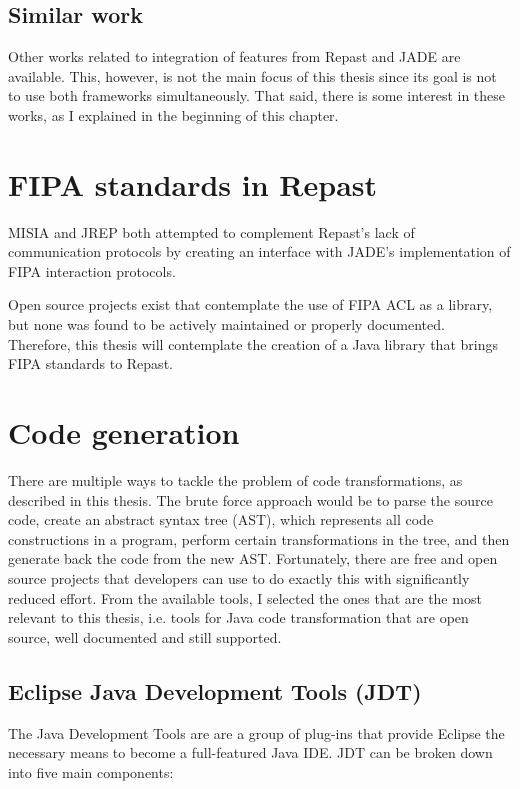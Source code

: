 \subsection{Similar work}
	Other works related to integration of features from Repast and JADE are available. This, however, is not the main focus of this thesis since its goal is not to use both frameworks simultaneously. That said, there is some interest in these works, as I explained in the beginning of this chapter. 


\section{FIPA standards in Repast}
	MISIA and JREP both attempted to complement Repast's lack of communication protocols by creating an interface with JADE's implementation of FIPA interaction protocols. 

	Open source projects exist that contemplate the use of FIPA ACL as a library, but none was found to be actively maintained or properly documented. Therefore, this thesis will contemplate the creation of a Java library that brings FIPA standards to Repast.


\section{Code generation}
	There are multiple ways to tackle the problem of code transformations, as described in this thesis. The brute force approach would be to parse the source code, create an abstract syntax tree (AST), which represents all code constructions in a program, perform certain transformations in the tree, and then generate back the code from the new AST. Fortunately, there are free and open source projects that developers can use to do exactly this with significantly reduced effort. From the available tools, I selected the ones that are the most relevant to this thesis, i.e. tools for Java code transformation that are open source, well documented and still supported. 

\subsection{Eclipse Java Development Tools (JDT)}

	The Java Development Tools are are a group of plug-ins that provide Eclipse the necessary means to become a full-featured Java IDE. JDT can be broken down into five main components: 

